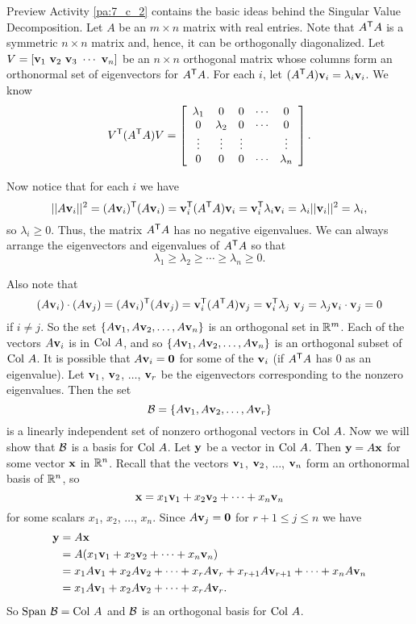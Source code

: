 Preview Activity \ref{pa:7_c_2} contains the basic ideas behind the Singular Value Decomposition. Let $A$ be an $m \times n$ matrix with real entries. Note that $A^{\mathsf{T}}A$ is a symmetric $n \times n$ matrix and, hence, it can be orthogonally diagonalized. Let $V = [\mathbf{v}_1 \ \mathbf{v}_2 \ \mathbf{v}_3 \  \cdots \  \mathbf{v}_n ]$ be an $n \times n$ orthogonal matrix whose columns form an orthonormal set of eigenvectors for $A^{\mathsf{T}}A$. For each $i$, let $(A^{\mathsf{T}}A)\mathbf{v}_i = \lambda_i \mathbf{v}_i$. We know
\[V^{\mathsf{T}} (A^{\mathsf{T}}A) V = \left[ \begin{array}{ccccc} \lambda_1&0&0&\cdots&0 \\ 0& \lambda_2&0&\cdots&0 \\ \vdots & \vdots & \vdots & & \vdots  \\ 0&0&0&\cdots& \lambda_n \end{array} \right].\]

Now notice that for each $i$ we have
\begin{equation}
|| A \mathbf{v}_i ||^2 = (A\mathbf{v}_i)^{\mathsf{T}}(A\mathbf{v}_i) = \mathbf{v}_i^{\mathsf{T}}(A^{\mathsf{T}}A) \mathbf{v}_i = \mathbf{v}_i^{\mathsf{T}} \lambda_i \mathbf{v}_i = \lambda_i ||\mathbf{v}_i||^2 = \lambda_i, \label{eq:7_c_sing_vals1}
\end{equation}
so $\lambda_i \geq 0$. Thus, the matrix $A^{\mathsf{T}}A$ has no negative eigenvalues. We can always arrange the eigenvectors and eigenvalues of $A^{\mathsf{T}}A$ so that
\[\lambda_1 \geq \lambda_2 \geq \cdots \geq \lambda_n \geq 0.\]

Also note that
\[(A\mathbf{v}_i) \cdot (A\mathbf{v}_j) = (A\mathbf{v}_i)^{\mathsf{T}} (A\mathbf{v}_j) = \mathbf{v}_i^{\mathsf{T}} (A^{\mathsf{T}}A) \mathbf{v}_j = \mathbf{v}_i^{\mathsf{T}} \lambda_j\ \mathbf{v}_j = \lambda_j \mathbf{v}_i \cdot \mathbf{v}_j = 0\]
if $i \neq j$. So the set $\{A\mathbf{v}_1, A\mathbf{v}_2, \ldots, A\mathbf{v}_n\}$ is an orthogonal set in $\mathbb{R}^m$. Each of the vectors $A\mathbf{v}_i$ is in $\text{Col } A$, and so $\{A\mathbf{v}_1, A\mathbf{v}_2, \ldots, A\mathbf{v}_n\}$ is an orthogonal subset of $\text{Col } A$. It is possible that $A\mathbf{v}_i = \mathbf{0}$ for some of the $\mathbf{v}_i$ (if $A^{\mathsf{T}}A$ has 0 as an eigenvalue). Let $\mathbf{v}_1$, $\mathbf{v}_2$, $\ldots$, $\mathbf{v}_r$ be the eigenvectors corresponding to the nonzero eigenvalues. Then the set
\[\mathcal{B}=\{A\mathbf{v}_1, A\mathbf{v}_2, \ldots, A\mathbf{v}_r\}\]
is a linearly independent set of nonzero orthogonal vectors in $\text{Col } A$. Now we will show that $\mathcal{B}$ is a basis for $\text{Col } A$. Let $\mathbf{y}$ be a vector in $\text{Col } A$. Then $\mathbf{y} = A\mathbf{x}$ for some vector $\mathbf{x}$ in $\mathbb{R}^n$. Recall that the vectors $\mathbf{v}_1$, $\mathbf{v}_2$, $\ldots$, $\mathbf{v}_n$ form an orthonormal basis of $\mathbb{R}^n$, so
\[\mathbf{x} = x_1 \mathbf{v}_1 + x_2 \mathbf{v}_2 + \cdots + x_n \mathbf{v}_n\]
for some scalars $x_1$, $x_2$, $\ldots$, $x_n$. Since $A\mathbf{v}_j = \mathbf{0}$ for $r+1 \leq j \leq n$ we have
\begin{align*}
\mathbf{y} &= A\mathbf{x} \\
	&= A(x_1 \mathbf{v}_1 + x_2 \mathbf{v}_2 + \cdots + x_n \mathbf{v}_n) \\
	&= x_1 A\mathbf{v}_1 + x_2 A\mathbf{v}_2 + \cdots + x_r A\mathbf{v}_r + x_{r+1} A \mathbf{v}_{r+1} + \cdots + x_n A\mathbf{v}_n \\
	&= x_1 A\mathbf{v}_1 + x_2 A\mathbf{v}_2 + \cdots + x_r A\mathbf{v}_r.
\end{align*}
So $\text{Span} \ \mathcal{B} = \text{Col } A$ and $\mathcal{B}$ is an orthogonal basis for $\text{Col } A$.

